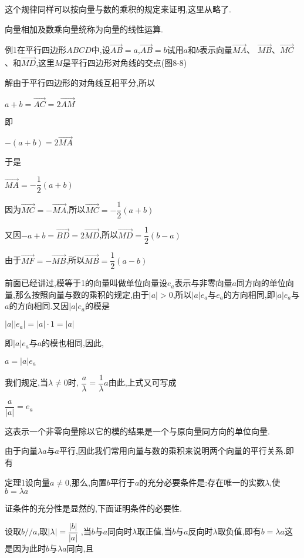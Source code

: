 \documentclass[oneside]{book}
\begin{document}
这个规律同样可以按向量与数的乘积的规定来证明,这里从略了.

向量相加及数乘向量统称为向量的线性运算.

例1在平行四边形$ABCD$中,设$\overrightarrow {AB}  = a$,$\overrightarrow {AB}  = b$试用$a$和$b$表示向量$\overrightarrow {MA} $、 $\overrightarrow {MB} $、$\overrightarrow {MC} $、和$\overrightarrow {MD} $,这里$M$是平行四边形对角线的交点(图8-8)

解\quad 由于平行四边形的对角线互相平分,所以

$a + b = \overrightarrow {AC}  = 2\overrightarrow {AM} $

即

$ - \left( {a + b} \right) = 2\overrightarrow {MA} $

于是

$\overrightarrow {MA}  =  - \dfrac{1}{2}(a + b)$

因为$\overrightarrow {MC}  =  - \overrightarrow {MA} $,所以$\overrightarrow {MC}  =  - \dfrac{1}{2}(a + b)$

又因$ - a + b = \overrightarrow {BD}  = 2\overrightarrow {MD} $,所以$\overrightarrow {MD}  = \dfrac{1}{2}(b - a)$

由于$\overrightarrow {MF}  =  - \overrightarrow {MB} $,所以$\overrightarrow {MB}  = \dfrac{1}{2}(a - b)$

前面已经讲过,模等于1的向量叫做单位向量设${e_a}$表示与非零向量$a$同方向的单位向量,那么按照向量与数的乘积的规定,由于$|a| > 0$,所以$|a|{e_a}$与${e_a}$的方向相同,即$|a|{e_a}$与$a$的方向相同.又因$|a|{e_a}$的模是

$|a||{e_a}| = |a| \cdot 1 = |a|$

即$|a|{e_a}$与$a$的模也相同,因此,

$a = |a|{e_a}$

我们规定,当$\lambda  \ne 0$时, $\dfrac{a}{\lambda } = \dfrac{1}{\lambda }a$由此,上式又可写成

$\dfrac{a}{{|a|}} = {e_a}$

这表示一个非零向量除以它的模的结果是一个与原向量同方向的单位向量.

由于向量$\lambda a$与$a$平行,因此我们常用向量与数的乘积来说明两个向量的平行关系.即有

定理1设向量$a \ne 0$,那么,向置$b$平行于$a$的充分必要条件是:存在唯一的实数$\lambda $,使$b = \lambda a$

证\quad 条件的充分性是显然的,下面证明条件的必要性.

设取$b//a$,取$|\lambda | = \dfrac{{|b|}}{{|a|}}$
,当$b$与$a$同向时$\lambda $取正值,当$b$与$a$反向时$\lambda $取负值,即有$b = \lambda a$这是因为此时$b$与$\lambda a$同向,且
\end{document}
